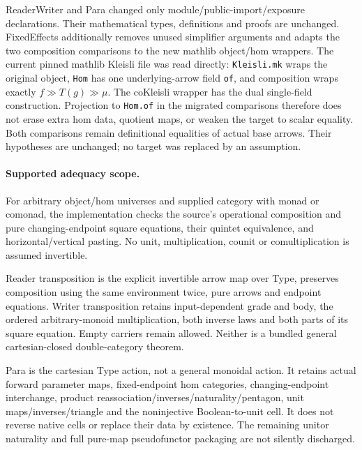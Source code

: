 \documentclass{article}
\begin{document}
ReaderWriter and Para changed only module/public-import/exposure declarations. Their mathematical types, definitions and proofs are unchanged. FixedEffects additionally removes unused simplifier arguments and adapts the two composition comparisons to the new mathlib object/hom wrappers. The current pinned mathlib Kleisli file was read directly: \texttt{Kleisli.mk} wraps the original object, \texttt{Hom} has one underlying-arrow field \texttt{of}, and composition wraps exactly $f\mathbin{\gg}T(g)\mathbin{\gg}\mu$. The coKleisli wrapper has the dual single-field construction. Projection to \texttt{Hom.of} in the migrated comparisons therefore does not erase extra hom data, quotient maps, or weaken the target to scalar equality. Both comparisons remain definitional equalities of actual base arrows. Their hypotheses are unchanged; no target was replaced by an assumption.

\paragraph{Supported adequacy scope.}
For arbitrary object/hom universes and supplied category with monad or comonad, the implementation checks the source's operational composition and pure changing-endpoint square equations, their quintet equivalence, and horizontal/vertical pasting. No unit, multiplication, counit or comultiplication is assumed invertible.

Reader transposition is the explicit invertible arrow map over Type, preserves composition using the same environment twice, pure arrows and endpoint equations. Writer transposition retains input-dependent grade and body, the ordered arbitrary-monoid multiplication, both inverse laws and both parts of its square equation. Empty carriers remain allowed. Neither is a bundled general cartesian-closed double-category theorem.

Para is the cartesian Type action, not a general monoidal action. It retains actual forward parameter maps, fixed-endpoint hom categories, changing-endpoint interchange, product reassociation/inverses/naturality/pentagon, unit maps/inverses/triangle and the noninjective Boolean-to-unit cell. It does not reverse native cells or replace their data by existence. The remaining unitor naturality and full pure-map pseudofunctor packaging are not silently discharged.
\end{document}
